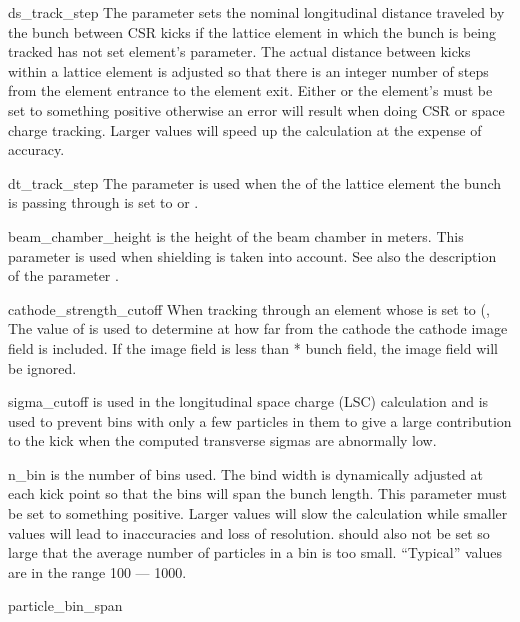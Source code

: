 {\begin{description}
\item{ds_track_step} \Newline
The  parameter sets the nominal longitudinal distance traveled by the bunch
between CSR kicks if the lattice element in which the bunch is being tracked has not set element's
 parameter. The actual distance between kicks within a lattice element is adjusted
so that there is an integer number of steps from the element entrance to the element exit. Either
 or the element's  must be set to something positive otherwise
an error will result when doing CSR or space charge tracking. Larger values will speed up the
calculation at the expense of accuracy.
%
\item{dt_track_step} \Newline
The  parameter is used when the  of the lattice element the
bunch is passing through is set to  or . 
%
\item{beam_chamber_height} \Newline
{} is the height of the beam chamber in meters. This parameter is used when
shielding is taken into account.  See also the description of the parameter .
%
\item{cathode_strength_cutoff} \Newline
When tracking through an element whose  is set to 
(, The value of  is used to determine at how far
from the cathode the cathode image field is included. If the image field is less than
 * bunch field, the image field will be ignored.
%
\item{sigma_cutoff} \Newline
{} is used in the longitudinal space charge (LSC) calculation and is used to prevent
bins with only a few particles in them to give a large contribution to the kick when the computed
transverse sigmas are abnormally low.
%
\item{n_bin} \Newline
{} is the number of bins used. The bind width is dynamically adjusted at each kick point so
that the bins will span the bunch length.  This parameter must be set to something positive. Larger
values will slow the calculation while smaller values will lead to inaccuracies and loss of
resolution.  should also not be set so large that the average number of particles in a bin
is too small.  ``Typical'' values are in the range 100 --- 1000.
%
\item{particle_bin_span} \Newline

\end{description}}
